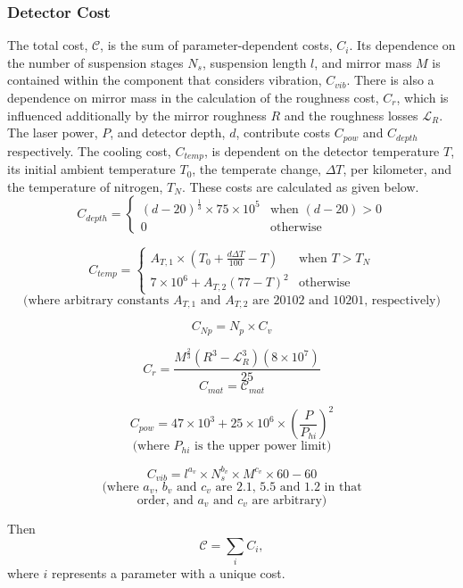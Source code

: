 \documentclass{article}
\begin{document}
\subsubsection{Detector Cost}
The total cost, $\mathcal{C}$, is the sum of parameter-dependent costs, $C_i$. Its dependence on the number of suspension stages $N_s$, suspension length $l$, and mirror mass $M$ is contained within the component that considers vibration, $C_{vib}$. There is also a dependence on mirror mass in the calculation of the roughness cost, $C_r$, which is influenced additionally by the mirror roughness $R$ and the roughness losses $\mathcal{L}_R$. The laser power, $P$, and detector depth, $d$, contribute costs $C_{pow}$ and $C_{depth}$ respectively. The cooling cost, $C_{temp}$, is dependent on the detector temperature $T$, its initial ambient temperature $T_0$, the temperate change, $\Delta T$, per kilometer, and the temperature of nitrogen, $T_N$. These costs are calculated as given below.
    \[C_{depth} = \begin{cases}
                  (d-20)^{\frac{1}{3}} \times 75 \times 10^5 & \text{when $(d-20) > 0$} \\
                  0 & \text{otherwise}
                  \end{cases}
    \]
    
    \[C_{temp} = \begin{cases}
                 A_{T, 1}\times\left(T_0 + \frac{d\Delta T}{100} - T\right) & \text{when $T > T_N$} \\
                 7 \times 10^6 + A_{T, 2}\left(77 - T\right)^2 & \text{otherwise}
                 \end{cases}
    \]
    \[
    \text{(where arbitrary constants $A_{T, 1}$ and $A_{T, 2}$ are 20102 and 10201, respectively)}
    \]
 \begin{multicols}{2}   
    \[C_{Np} = N_p \times C_v
    \]
    \par 
        \[C_{r} =\frac{M^{\frac{2}{3}}(R^3 - \mathcal{L}_R^3)(8 \times 10^7)}{25}
    \]
    \break
    \[C_{mat} = \mathcal{C}_{mat}
    \]
    \par
    \[C_{pow} = 47 \times 10^3 + 25 \times 10 ^ 6 \times \left(\frac{P}{P_{hi}}\right)^2 
    \]
    \[
    \text{(where $P_{hi}$ is the upper power limit)}
    \]
    \par
    \[C_{vib} = l^{a_v} \times N_s^{b_v} \times M^{c_v} \times 60 - 60
    \]
    \[
    \text{(where $a_v$, $b_v$ and $c_v$ are 2.1, 5.5 and 1.2 in that}
    \]
    \[
    \text{order, and $a_v$ and $c_v$ are arbitrary)}
    \]
 \end{multicols}   
\par 
Then
\[
\mathcal{C} = \sum_{i} C_i,
\]
where $i$ represents a parameter with a unique cost.
\end{document}
